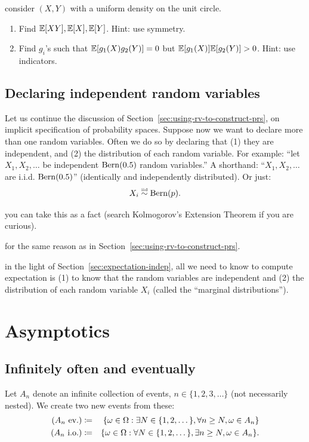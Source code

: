 \documentclass{article}
\begin{document}
 consider $(X,Y)$ with a uniform density on the unit circle. 
\begin{enumerate}
  \item Find ${\mathbb E}[XY], {\mathbb E}[X], {\mathbb E}[Y]$. Hint: use symmetry.
  \item Find $g_i$'s such that ${\mathbb E}[g_1(X) g_2(Y)] = 0$ but ${\mathbb E}[g_1(X)] {\mathbb E}[g_2(Y)] > 0$. Hint: use indicators.
\end{enumerate}


\subsection{Declaring independent random variables}

Let us continue the discussion of Section~\ref{sec:using-rv-to-construct-prs}, on implicit specification of probability spaces. Suppose now we want to declare more than one random variables. Often we do so by declaring that (1) they are independent, and (2) the distribution of each random variable. For example: ``let $X_1, X_2, \dots$ be independent $\operatorname{Bern}(0.5)$ random variables.'' A shorthand: ``$X_1, X_2, \dots$ are i.i.d. $\operatorname{Bern}(0.5)$'' (identically and independently distributed). Or just:
\[ X_i \stackrel{\scriptscriptstyle \textrm{iid}}{\sim} \operatorname{Bern}(p). \]

 you can take this as a fact (search Kolmogorov's Extension Theorem if you are curious). 

 for the same reason as in Section~\ref{sec:using-rv-to-construct-prs}.

 in the light of Section~\ref{sec:expectation-indep}, all we need to know to compute expectation is (1) to know that the random variables are independent and (2) the distribution of each random variable $X_i$ (called the ``marginal distributions'').


\section{Asymptotics}

\subsection{Infinitely often and eventually}\label{sec:io-ev}

 Let $A_n$ denote an infinite collection of events, $n\in\{1,2,3,\dots\}$ (not necessarily nested). We create two new events from these:
\begin{eqnarray*}
(A_n\text{ ev.}) &\coloneqq& \{\omega \in \Omega : \exists N \in \{1, 2, \dots\}, \forall n\ge N, \omega \in A_n \} \\
(A_n\text{ i.o.}) &\coloneqq& \{\omega \in \Omega : \forall N \in \{1, 2, \dots\}, \exists n\ge N, \omega \in A_n \}.
\end{eqnarray*}
\end{document}
